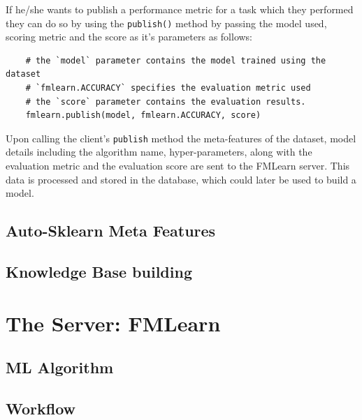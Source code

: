 If he/she wants to publish a performance metric for a task which they performed they can do so by using the \texttt{publish()} method by passing the model used, scoring metric and the score as it's parameters as follows:

\begin{lstlisting}
    # the `model` parameter contains the model trained using the dataset
    # `fmlearn.ACCURACY` specifies the evaluation metric used
    # the `score` parameter contains the evaluation results.
    fmlearn.publish(model, fmlearn.ACCURACY, score)
\end{lstlisting}

Upon calling the client's \texttt{publish} method the meta-features of the dataset, model details including the algorithm name, hyper-parameters, along with the evaluation metric and the evaluation score are sent to the FMLearn server. This data is processed and stored in the database, which could later be used to build a model.

\subsection{Auto-Sklearn Meta Features}
\label{auto-sklearn}

\subsection{Knowledge Base building}
\label{knowledge-base}

\section{The Server: FMLearn}
\label{fmlearn-server}

\subsection{ML Algorithm}
\subsection{Workflow}


